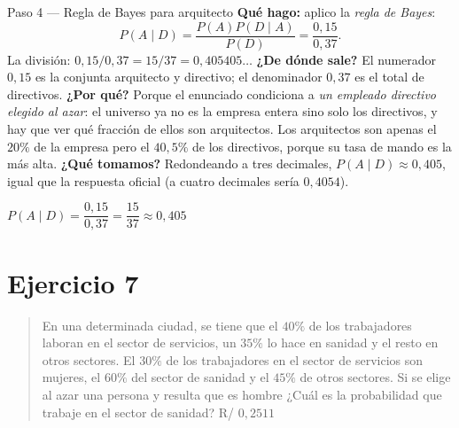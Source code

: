 \documentclass[11pt]{article}
\begin{document}
\begin{sol}
\begin{paso}{Paso 4 --- Regla de Bayes para arquitecto}
\textbf{Qué hago:} aplico la \emph{regla de Bayes}:
\[
P(A\mid D)=\frac{P(A)P(D\mid A)}{P(D)}=\frac{0,15}{0,37}.
\]
La división: $0,15/0,37=15/37=0,405405\ldots$
\textbf{¿De dónde sale?} El numerador $0,15$ es la conjunta arquitecto y directivo; el denominador $0,37$ es el total de directivos.
\textbf{¿Por qué?} Porque el enunciado condiciona a \emph{un empleado directivo elegido al azar}: el universo ya no es la empresa entera sino solo los directivos, y hay que ver qué fracción de ellos son arquitectos. Los arquitectos son apenas el $20\%$ de la empresa pero el $40,5\%$ de los directivos, porque su tasa de mando es la más alta.
\textbf{¿Qué tomamos?} Redondeando a tres decimales, $P(A\mid D)\approx 0,405$, igual que la respuesta oficial (a cuatro decimales sería $0,4054$).
\end{paso}

\begin{resp}
$P(A\mid D)=\dfrac{0,15}{0,37}=\dfrac{15}{37}\approx 0,405$
\end{resp}

\end{sol}

\newpage
\section*{Ejercicio 7}

\begin{quote}
En una determinada ciudad, se tiene que el $40\%$ de los trabajadores laboran en el sector de servicios, un $35\%$ lo hace en sanidad y el resto en otros sectores. El $30\%$ de los trabajadores en el sector de servicios son mujeres, el $60\%$ del sector de sanidad y el $45\%$ de otros sectores. Si se elige al azar una persona y resulta que es hombre ¿Cuál es la probabilidad que trabaje en el sector de sanidad? \hfill R/ $0,2511$
\end{quote}
\end{document}
